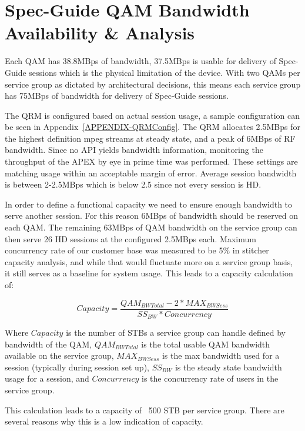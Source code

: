 \documentclass{article}
\begin{document}
\section{Spec-Guide QAM Bandwidth Availability \& Analysis}
\label{SECTION-QAMCapacity}

Each QAM has 38.8MBps of bandwidth, 37.5MBps is usable for delivery of Spec-Guide sessions which is the physical limitation of the device. With two QAMs per service group as dictated by architectural decisions, this means each service group has 75MBps of bandwidth for delivery of Spec-Guide sessions. 

The QRM is configured based on actual session usage, a sample configuration can be seen in Appendix~\ref{APPENDIX-QRMConfig}. The QRM allocates 2.5MBps for the highest definition mpeg streams at steady state, and a peak of 6MBps of RF bandwidth. Since no API yields bandwidth information, monitoring the throughput of the APEX by eye in prime time was performed. These settings are matching usage within an acceptable margin of error. Average session bandwidth is between 2-2.5MBps which is below 2.5 since not every session is HD. 

In order to define a functional capacity we need to ensure enough bandwidth to serve another session. For this reason 6MBps of bandwidth should be reserved on each QAM. The remaining 63MBps of QAM bandwidth on the service group can then serve 26 HD sessions at the configured 2.5MBps each. Maximum concurrency rate of our customer base was measured to be 5\% in stitcher capacity analysis, and while that would fluctuate more on a service group basis, it still serves as a baseline for system usage. This leads to a capacity calculation of: 

$$Capacity=\frac{QAM_{BWTotal}-2*MAX_{BWSess}}{SS_{BW}*Concurrency}$$ 

Where $Capacity$ is the number of STBs a service group can handle defined by bandwidth of the QAM, $QAM_{BWTotal}$ is the total usable QAM bandwidth available on the service group, $MAX_{BWSess}$ is the max bandwidth used for a session (typically during session set up), $SS_{BW}$ is the steady state bandwidth usage for a session, and $Concurrency$ is the concurrency rate of users in the service group. 

This calculation leads to a capacity of ~500 STB per service group. There are several reasons why this is a low indication of capacity. 
\end{document}
